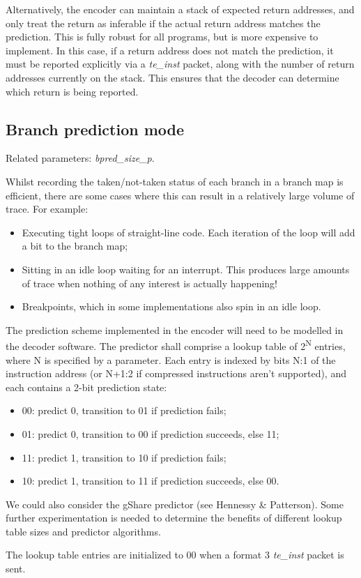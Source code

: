 Alternatively, the encoder can maintain a stack of expected return addresses, and only treat the 
return as inferable if the actual return address matches the prediction.  This is fully robust for all
programs, but is more expensive to implement.  In this case, if a return address does not match the prediction, 
it must be reported explicitly via a \textit{te\_inst} packet, along with the number of return addresses 
currently on the stack.  This ensures that the decoder can determine which return is being reported. 

\subsection{Branch prediction mode} \label{sec:branch-prediction}

Related parameters: \textit{bpred\_size\_p}.

Whilst recording the taken/not-taken status of each branch in a branch map is efficient, there are 
some cases where this can result in a relatively large volume of trace.  For example:

\begin{itemize}
  \item Executing tight loops of straight-line code.  Each iteration of the loop will add a bit to the branch map;
  \item Sitting in an idle loop waiting for an interrupt.  This produces large amounts of trace when nothing of 
  any interest is actually happening!  
  \item Breakpoints, which in some implementations also spin in an idle loop.
\end{itemize}

The prediction scheme implemented in the encoder will need to be modelled in the decoder software.  
The predictor shall comprise a lookup table of 2\textsuperscript{N} entries, where N is specified by a parameter.  
Each entry is indexed by bits N:1 of the instruction address (or N+1:2 if compressed instructions aren't supported), 
and each contains a 2-bit prediction state:
\begin{itemize}
  \item 00: predict 0, transition to 01 if prediction fails;
  \item 01: predict 0, transition to 00 if prediction succeeds, else 11;
  \item 11: predict 1, transition to 10 if prediction fails;
  \item 10: predict 1, transition to 11 if prediction succeeds, else 00.
\end{itemize}

We could also consider the gShare predictor (see Hennessy \& Patterson).  Some further experimentation is needed
to determine the benefits of different lookup table sizes and predictor algorithms.

The lookup table entries are initialized to 00 when a format 3 \textit{te\_inst} packet is sent.

